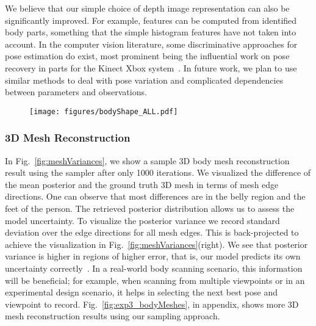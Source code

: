 We believe that our simple choice of depth image representation can
also be significantly improved. For example, features can be
computed from identified body parts, something that the simple
histogram features have not taken into account. In the computer vision
literature, some discriminative approaches for pose estimation do
exist, most prominent being the influential work on pose recovery in parts for
the Kinect Xbox system~\cite{shotton2011kinect}.
In future work, we plan to use similar methods to deal with pose variation and
complicated dependencies between parameters and observations.

\begin{figure}[h]
\begin{center}
\centerline{\texttt{[image: figures/bodyShape\_ALL.pdf]}}
\label{fig:bodyShape_ALL}
\end{center}
\end{figure}


\subsubsection{3D Mesh Reconstruction}

In Fig.~\ref{fig:meshVariances}, we show a sample 3D body mesh
reconstruction result using the \MIXLMH sampler after only 1000
iterations. We visualized the difference of the mean posterior and the
ground truth 3D mesh in terms of mesh edge directions. One can observe
that most differences are in the belly region and the feet of the
person. The retrieved posterior distribution allows us to assess the
model uncertainty.
To visualize the posterior variance we record standard deviation over
the edge directions for all mesh edges. This is back-projected to
achieve the visualization in Fig.~\ref{fig:meshVariances}(right). We see
that posterior variance is higher in regions of higher error, that is, our
model predicts its own uncertainty correctly~\cite{dawid1982calibration}. In a
real-world body scanning scenario, this information will be
beneficial; for example, when scanning from multiple viewpoints or in
an experimental design scenario, it helps in selecting the next best
pose and viewpoint to record.
Fig.~\ref{fig:exp3_bodyMeshes}, in appendix, shows more 3D mesh reconstruction
results using our sampling approach.

